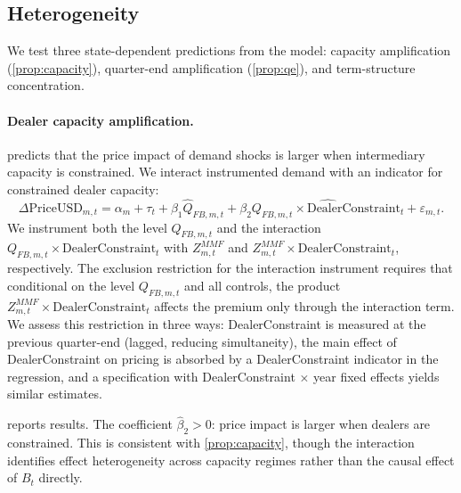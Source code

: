\subsection{Heterogeneity}
\label{subsec:heterogeneity}

We test three state-dependent predictions from the model: capacity amplification
(\cref{prop:capacity}), quarter-end amplification (\cref{prop:qe}), and term-structure
concentration.

\paragraph{Dealer capacity amplification.}  predicts that the price
impact of demand shocks is larger when intermediary capacity is constrained. We
interact instrumented demand with an indicator for constrained dealer capacity:
\begin{equation}
  \Delta\text{PriceUSD}_{m,t} = \alpha_m + \tau_t + \beta_1 \hat{Q}_{FB,m,t} +
  \beta_2 \widehat{Q_{FB,m,t} \times \text{DealerConstraint}_t} + \varepsilon_{m,t}.
  \label{eq:interaction}
\end{equation}
We instrument both the level $Q_{FB,m,t}$ and the interaction $Q_{FB,m,t} \times
\text{DealerConstraint}_t$ with $Z_{m,t}^{MMF}$ and $Z_{m,t}^{MMF} \times
\text{DealerConstraint}_t$, respectively. The exclusion restriction for the
interaction instrument requires that conditional on the level $Q_{FB,m,t}$ and
all controls, the product $Z_{m,t}^{MMF} \times \text{DealerConstraint}_t$
affects the premium only through the interaction term. We assess this restriction
in three ways: DealerConstraint is measured at the previous quarter-end (lagged,
reducing simultaneity), the main effect of DealerConstraint on pricing is
absorbed by a DealerConstraint indicator in the regression, and a specification
with DealerConstraint $\times$ year fixed effects yields similar estimates.

 reports results. The coefficient $\hat\beta_2 > 0$:
price impact is larger when dealers are constrained. This is consistent with
\cref{prop:capacity}, though the interaction identifies effect heterogeneity across
capacity regimes rather than the causal effect of $B_t$ directly.

